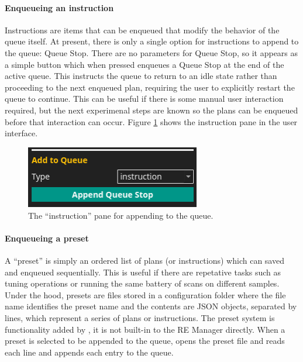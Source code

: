 \paragraph{Enqueueing an instruction}
Instructions are items that can be enqueued that modify the behavior of the queue itself.
At present, there is only a single option for instructions to append to the queue: Queue Stop.
There are no parameters for Queue Stop, so it appears as a simple button which when pressed enqueues a Queue Stop at the end of the active queue.
This instructs the queue to return to an idle state rather than proceeding to the next enqueued plan, requiring the user to explicitly restart the queue to continue.
This can be useful if there is some manual user interaction required, but the next experimenal steps are known so the plans can be enqueued before that interaction can occur.
Figure \ref{acq:fig:instruction} shows the instruction pane in the user interface.


\begin{figure}
\includegraphics[width=3in]{"acquisition/images/instruction"}
\caption[Instruction Pane]{
	The ``instruction'' pane for appending to the queue.
}
\label{acq:fig:instruction}
\end{figure}

\paragraph{Enqueueing a preset}

A ``preset'' is simply an ordered list of plans (or instructions) which can saved and enqueued sequentially.
This is useful if there are repetative tasks such as tuning operations or running the same battery of scans on different samples.
Under the hood, presets are files stored in a configuration folder where the file name identifies the preset name and the contents are JSON objects, separated by lines, which represent a series of plans or instructions.
The preset system is functionality added by \blueskycmds, it is not built-in to the RE Manager directly.
When a preset is selected to be appended to the queue, \blueskycmds opens the preset file and reads each line and appends each entry to the queue.

